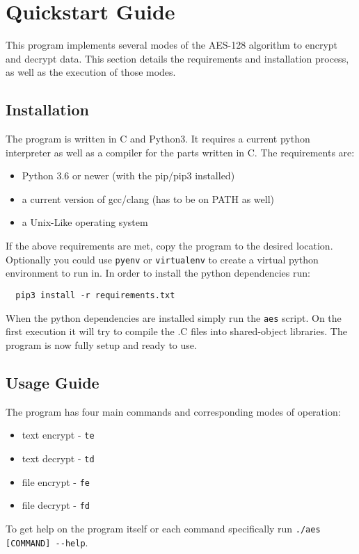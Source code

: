 \chapter{Quickstart Guide}

This program implements several modes of the AES-128 algorithm to encrypt and decrypt data. This section details the requirements and installation process, as well as the execution of those modes.

\section{Installation}

The program is written in C and Python3. It requires a current python interpreter as well as a compiler for the parts written in C. The requirements are:
\begin{itemize}
  \item Python 3.6 or newer (with the pip/pip3 installed)
  \item a current version of gcc/clang (has to be on PATH as well)
  \item a Unix-Like operating system
\end{itemize}

If the above requirements are met, copy the program to the desired location. Optionally you could use \lstinline{pyenv} or \lstinline{virtualenv} to create a virtual python environment to run in. In order to install the python dependencies run:
\begin{lstlisting}
  pip3 install -r requirements.txt
\end{lstlisting}

When the python dependencies are installed simply run the \lstinline{aes} script. On the first execution it will try to compile the .C files into shared-object libraries. The program is now fully setup and ready to use.

\section{Usage Guide}
The program has four main commands and corresponding modes of operation:
\begin{itemize}
  \item text encrypt -  \lstinline{te}
  \item text decrypt -  \lstinline{td}
  \item file encrypt -  \lstinline{fe}
  \item file decrypt -  \lstinline{fd}
\end{itemize}
To get help on the program itself or each command specifically run \lstinline{./aes [COMMAND] --help}.

